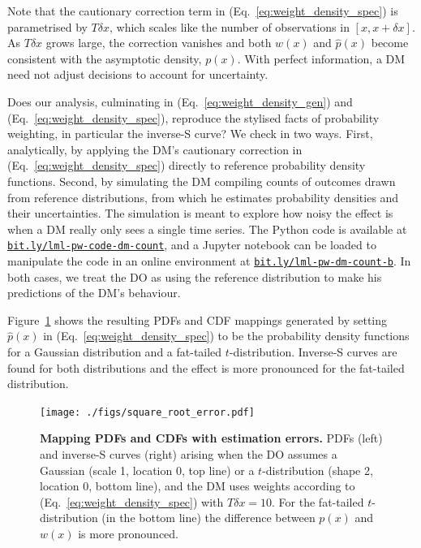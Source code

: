 \documentclass[a4paper, 12pt]{article}
\newcommand{\eref}[1]{(Eq.~\ref{eq:#1})}
\newcommand{\flabel}[1]{\label{fig:#1}}
\newcommand{\Fref}[1]{Figure~\ref{fig:#1}}
\newcommand{\phat}{\hat{p}}
\begin{document}
Note that the cautionary correction term in \eref{weight_density_spec} is parametrised by $T\delta x$, which scales like the number of observations in $[x, x+\delta x]$. As $T\delta x$ grows large, the correction vanishes and both $w(x)$ and $\phat(x)$ become consistent with the asymptotic density, $p(x)$. With perfect information, a DM need not adjust decisions to account for uncertainty.

Does our analysis, culminating in \eref{weight_density_gen} and \eref{weight_density_spec}, reproduce the stylised facts of probability weighting, in particular the inverse-S curve? We check in two ways. First, analytically, by applying the DM's cautionary correction in \eref{weight_density_spec} directly to reference probability density functions. Second, by simulating the DM compiling counts of outcomes drawn from reference distributions, from which he estimates probability densities and their uncertainties. The simulation is meant to explore how noisy the effect is when a DM really only sees a single time series. The Python code is available at \href{https://bit.ly/lml-pw-code-dm-count}{\texttt{bit.ly/lml-pw-code-dm-count}}, and a Jupyter notebook can be loaded to manipulate the code in an online environment at \href{https://bit.ly/lml-pw-dm-count-b}{\texttt{bit.ly/lml-pw-dm-count-b}}. In both cases, we treat the DO as using the reference distribution to make his predictions of the DM's behaviour.

\Fref{square_root_error} shows the resulting PDFs and CDF mappings generated by setting $\phat(x)$ in \eref{weight_density_spec} to be the probability density functions for a Gaussian distribution and a fat-tailed $t$-distribution. Inverse-S curves are found for both distributions and the effect is more pronounced for the fat-tailed distribution.
\begin{figure}[!htb]
\centering
\texttt{[image: ./figs/square\_root\_error.pdf]}
\caption{\textbf{Mapping PDFs and CDFs with estimation errors.} PDFs (left) and inverse-S curves (right) arising when the DO assumes a Gaussian (scale 1, location 0, top line) or a $t$-distribution (shape 2, location 0, bottom line), and the DM uses weights according to \eref{weight_density_spec} with $T\delta x=10$. For the fat-tailed $t$-distribution (in the bottom line) the difference between $p(x)$ and $w(x)$ is more pronounced.}
\flabel{square_root_error}
\end{figure}
\end{document}
